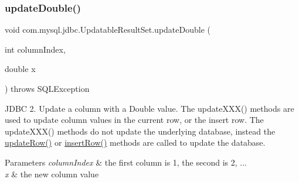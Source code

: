 \subsubsection{\texorpdfstring{update\+Double()}{updateDouble()}\hspace{0.1cm}{\footnotesize\ttfamily [1/2]}}
{\footnotesize\ttfamily void com.\+mysql.\+jdbc.\+Updatable\+Result\+Set.\+update\+Double (\begin{DoxyParamCaption}\item[{int}]{column\+Index,  }\item[{double}]{x }\end{DoxyParamCaption}) throws S\+Q\+L\+Exception}

J\+D\+BC 2. Update a column with a Double value. The update\+X\+X\+X() methods are used to update column values in the current row, or the insert row. The update\+X\+X\+X() methods do not update the underlying database, instead the \mbox{\hyperlink{classcom_1_1mysql_1_1jdbc_1_1_updatable_result_set_a919969ba4b3c7cbc7b18605e9f31a746}{update\+Row()}} or \mbox{\hyperlink{classcom_1_1mysql_1_1jdbc_1_1_updatable_result_set_aef041f8d9d0778083716fc26652648fa}{insert\+Row()}} methods are called to update the database.


\begin{DoxyParams}{Parameters}
{\em column\+Index} & the first column is 1, the second is 2, ... \\
\hline
{\em x} & the new column value\\
\hline
\end{DoxyParams}

